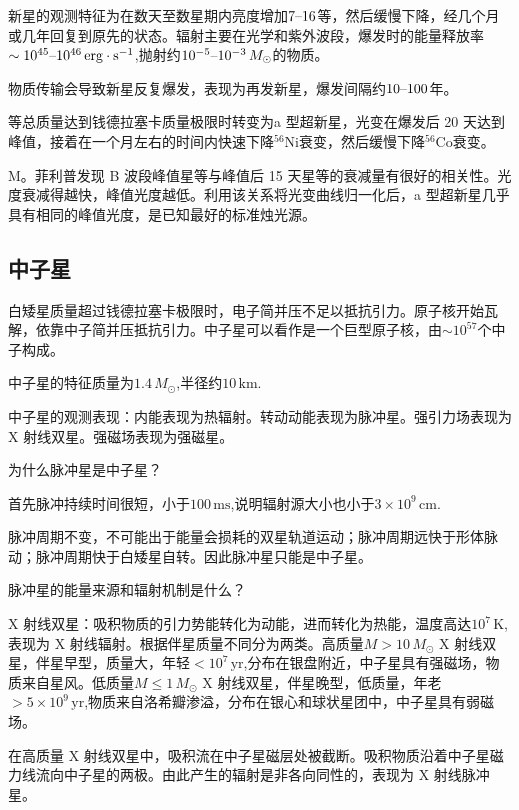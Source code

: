 \documentclass[../天体物理基础.tex]{subfiles}
\begin{document}
新星的观测特征为在数天至数星期内亮度增加$7\text{\textendash}16$等，然后缓慢下降，经几个月或几年回复到原先的状态。辐射主要在光学和紫外波段，爆发时的能量释放率$\sim10^{45}\text{\textendash}10^{46}\,\mathrm{erg\cdot{}s^{-1}}$,抛射约$10^{-5}\text{\textendash}10^{-3}\,M_{\odot}$的物质。

物质传输会导致新星反复爆发，表现为再发新星，爆发间隔约$10\text{\textendash}100$年。

等总质量达到钱德拉塞卡质量极限时转变为\uppercase\expandafter{}a 型超新星，光变在爆发后 20 天达到峰值，接着在一个月左右的时间内快速下降${}^{56}\mathrm{Ni}$衰变，然后缓慢下降${}^{56}\mathrm{Co}$衰变。

M。菲利普发现 B 波段峰值星等与峰值后 15 天星等的衰减量有很好的相关性。光度衰减得越快，峰值光度越低。利用该关系将光变曲线归一化后，\uppercase\expandafter{}a 型超新星几乎具有相同的峰值光度，是已知最好的标准烛光源。

\subsection{中子星}

白矮星质量超过钱德拉塞卡极限时，电子简并压不足以抵抗引力。原子核开始瓦解，依靠中子简并压抵抗引力。中子星可以看作是一个巨型原子核，由$\sim10^{57}$个中子构成。

中子星的特征质量为$1.4\,M_{\odot}$,半径约$10\,\mathrm{km}$.

中子星的观测表现：内能表现为热辐射。转动动能表现为脉冲星。强引力场表现为 X 射线双星。强磁场表现为强磁星。

为什么脉冲星是中子星？

首先脉冲持续时间很短，小于$100\,\mathrm{ms}$,说明辐射源大小也小于$3\times10^{9}\,\mathrm{cm}$.

脉冲周期不变，不可能出于能量会损耗的双星轨道运动；脉冲周期远快于形体脉动；脉冲周期快于白矮星自转。因此脉冲星只能是中子星。

脉冲星的能量来源和辐射机制是什么？


X 射线双星：吸积物质的引力势能转化为动能，进而转化为热能，温度高达$10^{7}\,\mathrm{K}$,表现为 X 射线辐射。根据伴星质量不同分为两类。高质量$M>10\,M_{\odot}$ X 射线双星，伴星早型，质量大，年轻$<10^{7}\,\mathrm{yr}$,分布在银盘附近，中子星具有强磁场，物质来自星风。低质量$M\le1\,M_{\odot}$ X 射线双星，伴星晚型，低质量，年老$>5\times10^{9}\,\mathrm{yr}$,物质来自洛希瓣渗溢，分布在银心和球状星团中，中子星具有弱磁场。

在高质量 X 射线双星中，吸积流在中子星磁层处被截断。吸积物质沿着中子星磁力线流向中子星的两极。由此产生的辐射是非各向同性的，表现为 X 射线脉冲星。
\end{document}
